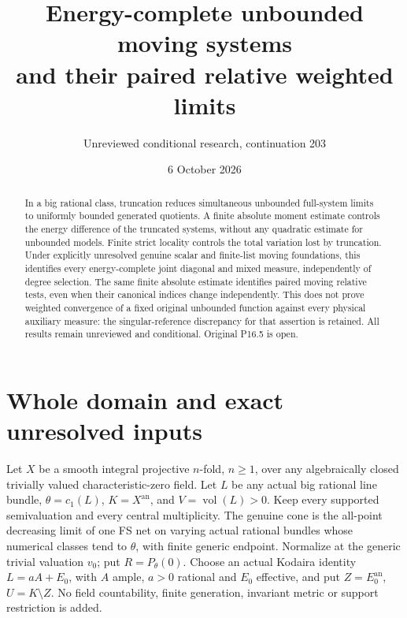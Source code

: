 \documentclass[11pt]{article}
\title{Energy-complete unbounded moving systems\protect\\
and their paired relative weighted limits}
\author{Unreviewed conditional research, continuation 203}
\date{6 October 2026}
\newcommand{\vol}{\operatorname{vol}}
\begin{document}
\maketitle
\begin{abstract}
In a big rational class, truncation reduces simultaneous unbounded
full-system limits to uniformly bounded generated quotients.
A finite absolute moment estimate controls the energy difference of
the truncated systems, without any quadratic estimate for unbounded
models. Finite strict locality controls the total variation lost by
truncation. Under explicitly unresolved genuine scalar and finite-list
moving foundations, this identifies every energy-complete joint
diagonal and mixed measure, independently of degree selection.
The same finite absolute estimate identifies paired moving relative
tests, even when their canonical indices change independently.
This does not prove weighted convergence of a fixed original
unbounded function against every physical auxiliary measure:
the singular-reference discrepancy for that assertion is retained.
All results remain unreviewed and conditional. Original P16.5 is open.
\end{abstract}

\section{Whole domain and exact unresolved inputs}
Let $X$ be a smooth integral projective $n$-fold, $n\geq1$, over
any algebraically closed trivially valued characteristic-zero field.
Let $L$ be any actual big rational line bundle, $\theta=c_1(L)$,
$K=X^{\mathrm{an}}$, and $V=\vol(L)>0$.
Keep every supported semivaluation and every central multiplicity.
The genuine cone is the all-point decreasing limit of one FS net on
varying actual rational bundles whose numerical classes tend to
$\theta$, with finite generic endpoint. Normalize at the generic
trivial valuation $v_0$; put $R=P_\theta(0)$.
Choose an actual Kodaira identity $L=aA+E_0$, with $A$ ample,
$a>0$ rational and $E_0$ effective, and put
$Z=E_0^{\mathrm{an}}$, $U=K\setminus Z$.
No field countability, finite generation, invariant metric or support
restriction is added.
\end{document}
